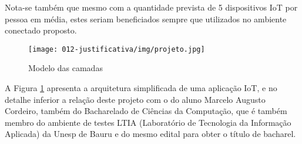 Nota-se também que mesmo com a quantidade prevista de 5 dispositivos IoT por
pessoa em média, estes seriam beneficiados sempre que utilizados no ambiente
conectado proposto.

\begin{figure}[htb]
	\caption{\label{fig-projeto}Modelo das camadas }
	\begin{center}
		\texttt{[image: 012-justificativa/img/projeto.jpg]}
	\end{center}
\end{figure}

A Figura \ref{fig-projeto} apresenta a arquitetura simplificada de uma aplicação
IoT, e no detalhe inferior a relação deste projeto com o do aluno Marcelo Augusto
Cordeiro, também do Bacharelado de Ciências da Computação, que é também membro do
ambiente de testes LTIA (Laboratório de Tecnologia da Informação Aplicada) da Unesp de Bauru
e do mesmo edital para obter o título de bacharel.
